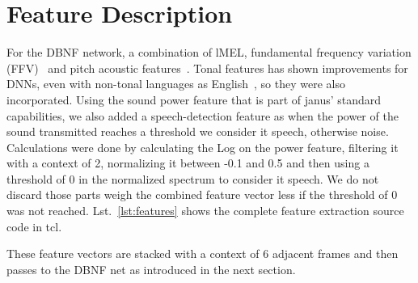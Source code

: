 \section{Feature Description}
\label{sec:FP:FD}
For the DBNF network, a combination of lMEL, fundamental frequency variation (FFV)~\cite{laskowski2008fundamental} and pitch acoustic features~\cite{schubert1999grundfrequenzverfolgung}. Tonal features has shown improvements for DNNs, even with non-tonal languages as English~\cite{metze2013models}, so they were also incorporated.
Using the sound power feature that is part of janus' standard capabilities, we also added a speech-detection feature as when the power of the sound transmitted reaches a threshold we consider it speech, otherwise noise. Calculations were done by calculating the Log on the power feature, filtering it with a context of 2, normalizing it between -0.1 and 0.5 and then using a threshold of 0 in the normalized spectrum to consider it speech. We do not discard those parts weigh the combined feature vector less if the threshold of 0 was not reached.   Lst.~\ref{lst:features} shows the complete feature extraction source code in tcl.

These feature vectors are stacked with a context of 6 adjacent frames and then passes to the DBNF net as introduced in the next section.

